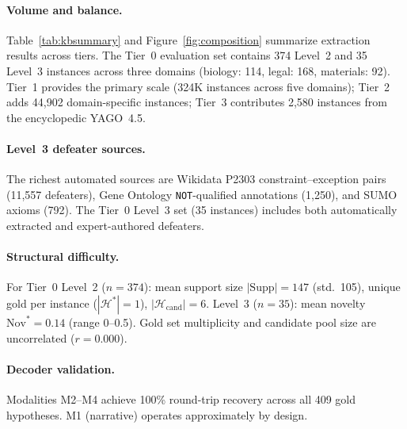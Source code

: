 \documentclass{article}
\theoremstyle{definition}
\newcommand{\Hcand}{\mathcal{H}_{\mathrm{cand}}}
\newcommand{\Hgold}{\mathcal{H}^{*}}
\newcommand{\Supp}{\mathrm{Supp}}
\newcommand{\Nov}{\mathrm{Nov}}
\begin{document}
\paragraph{Volume and balance.}
Table~\ref{tab:kbsummary} and Figure~\ref{fig:composition} summarize extraction results across tiers. The Tier~0 evaluation set contains 374 Level~2 and 35 Level~3 instances across three domains (biology: 114, legal: 168, materials: 92). Tier~1 provides the primary scale (324K instances across five domains); Tier~2 adds 44,902 domain-specific instances; Tier~3 contributes 2,580 instances from the encyclopedic YAGO~4.5.

\paragraph{Level~3 defeater sources.}
The richest automated sources are Wikidata P2303 constraint--exception pairs (11,557 defeaters), Gene Ontology \texttt{NOT}-qualified annotations (1,250), and SUMO axioms (792). The Tier~0 Level~3 set (35 instances) includes both automatically extracted and expert-authored defeaters.

\paragraph{Structural difficulty.}
For Tier~0 Level~2 ($n = 374$): mean support size $|\Supp| = 147$ (std.\ 105), unique gold per instance ($|\Hgold| = 1$), $|\Hcand| = 6$. Level~3 ($n = 35$): mean novelty $\Nov^* = 0.14$ (range 0--0.5). Gold set multiplicity and candidate pool size are uncorrelated ($r = 0.000$).

\paragraph{Decoder validation.}
Modalities M2--M4 achieve 100\% round-trip recovery across all 409 gold hypotheses. M1 (narrative) operates approximately by design.
\end{document}

